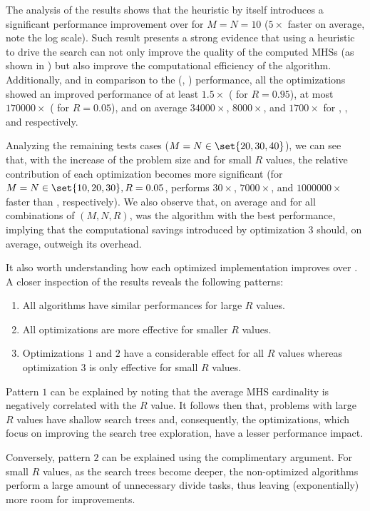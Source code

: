 The analysis of the results shows that the heuristic by itself
introduces a significant performance improvement over
 for $M = N = 10$ ($5\times$ faster on average,
note the log scale).
%
Such result presents a strong evidence that using a heuristic to
drive the search can not only improve the quality of the computed
\acp{MHS} (as shown in \citep{Abreu09b}) but also improve the
computational efficiency of the algorithm.
%
Additionally, and in comparison to the  (\ie,
\staccato{}) performance, all the optimizations showed an improved
performance of at least $1.5\times$ ( for $R=0.95$), at
most $170000\times$ ( for $R=0.05$), and on average
$34000\times$, $8000\times$, and $1700\times$ for ,
, and  respectively.

Analyzing the remaining tests cases ($M = N \in \set{20,30,40}$), we
can see that, with the increase of the problem size and for small $R$
values, the relative contribution of each optimization becomes more
significant (for $M = N \in \set{10,20,30}, R=0.05$, 
performs $30\times$, $7000\times$, and $1000000\times$ faster than
, respectively).
%
We also observe that, on average and for all combinations of
$(M,N,R)$,  was the algorithm with the best
performance, implying that the computational savings introduced by
optimization $3$ should, on average, outweigh its overhead.

It also worth understanding how each optimized implementation
improves over .
%
A closer inspection of the results reveals the following patterns:
\begin{enumerate}[nolistsep,topsep=0pt]
\item All algorithms have similar performances for large $R$ values.
\item All optimizations are more effective for smaller $R$ values.
\item Optimizations $1$ and $2$ have a considerable effect for all $R$
  values whereas optimization $3$ is only effective for small $R$
  values.
\end{enumerate}
%
Pattern $1$ can be explained by noting that the average \ac{MHS}
cardinality is negatively correlated with the $R$ value.
%
It follows then that, problems with large $R$ values have shallow
search trees and, consequently, the optimizations, which focus on
improving the search tree exploration, have a lesser performance
impact.

Conversely, pattern $2$ can be explained using the complimentary
argument.
%
For small $R$ values, as the search trees become deeper, the
non-optimized algorithms perform a large amount of unnecessary divide
tasks, thus leaving (exponentially) more room for improvements.

